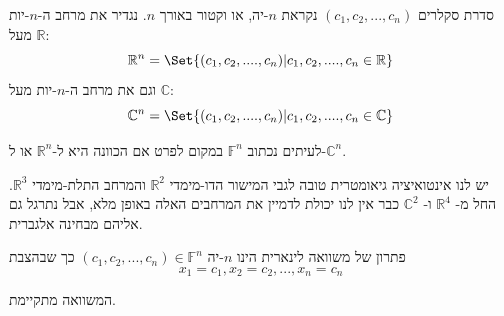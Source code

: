 \documentclass[
  hebrew,
  12pt,
  a4paper,
  oneside]{book}
\theoremstyle{definition}
\theoremstyle{remark}
\theoremstyle{plain}
\theoremstyle{remark}
\begin{document}
\begin{definition}

סדרת סקלרים \((c_1,c_2,...,c_n)\) נקראת \(n\)-יה, או וקטור באורך \(n\).
נגדיר את מרחב ה-\(n\)-יות מעל \(\mathbb R\):
\[\mathbb R^{n}=\Set{(c_1,c_2,....,c_n)|c_1,c_2,....,c_n\in\mathbb R}\]
וגם את מרחב ה-\(n\)-יות מעל \(\mathbb C\):
\[\mathbb C^{n}=\Set{(c_1,c_2,....,c_n)|c_1,c_2,....,c_n\in\mathbb C}\]

לעיתים נכתוב \(\mathbb F^n\) במקום לפרט אם הכוונה היא ל-\(\mathbb R^n\)
או ל-\(\mathbb C^n\).

\end{definition}

יש לנו אינטואיציה גיאומטרית טובה לגבי המישור הדו-מימדי \(\mathbb R^2\)
והמרחב התלת-מימדי \(\mathbb R^3\). החל מ- \(\mathbb R^4\) ו-
\(\mathbb C^2\) כבר אין לנו יכולת לדמיין את המרחבים האלה באופן מלא, אבל
נתרגל גם אליהם מבחינה אלגברית.

\begin{definition}

פתרון של משוואה לינארית הינו \(n\)-יה
\((c_1,c_2,...,c_n)\in\mathbb F^{n}\) כך שבהצבת
\[x_1=c_1,x_2=c_2,...,x_n=c_n\]

המשוואה מתקיימת.

\end{definition}
\end{document}
